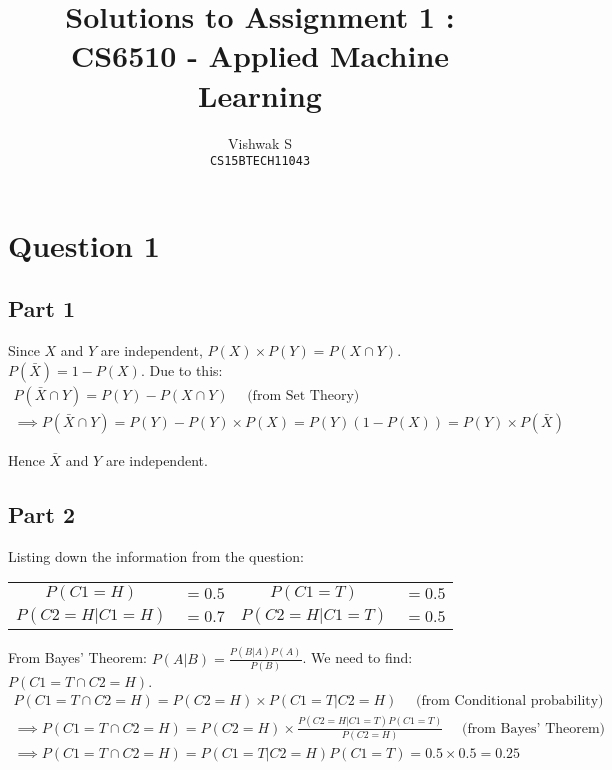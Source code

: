 \documentclass{article}
\title{Solutions to Assignment 1 : CS6510 - Applied Machine Learning}
\author{Vishwak S\\
\texttt{CS15BTECH11043}}
\date{}
\begin{document}
\maketitle

\section*{Question 1}
\subsection*{Part 1}
\begin{flushleft}
Since \(X\) and \(Y\) are independent, \(P(X)\times P(Y) = P(X \cap Y)\). \(P(\bar{X}) = 1 - P(X)\). Due to this:
\begin{gather*}
P(\bar{X} \cap Y) = P(Y) - P(X \cap Y) \quad \text{ (from Set Theory)} \\
\implies P(\bar{X} \cap Y) = P(Y) - P(Y)\times P(X) = P(Y)(1 - P(X)) = P(Y) \times P(\bar{X}) 
\end{gather*}

Hence \(\bar{X}\) and \(Y\) are independent.
\end{flushleft}

\subsection*{Part 2}
\begin{flushleft}
Listing down the information from the question:
\begin{center}
\begin{tabular}{c c c c}
\(P(C1 = H) \) & \(= 0.5\) & \(P(C1 = T) \) & \( = 0.5\) \\
\(P(C2 = H | C1 = H) \) & \(= 0.7\) & \(P(C2 = H | C1 = T) \) & \( = 0.5\) 
\end{tabular}
\end{center}

From Bayes' Theorem: \(P(A | B) = \displaystyle \frac{P(B | A) P(A)}{P(B)}\). We need to find: \(P(C1 = T \cap C2 = H)\).
\begin{gather*}
P(C1 = T \cap C2 = H) = P(C2 = H) \times P(C1 = T | C2 = H) \quad \text{ (from Conditional probability)} \\
\implies P(C1 = T \cap C2 = H) = P(C2 = H) \times \displaystyle \frac{P(C2 = H | C1 = T) P(C1 = T)}{P(C2 = H)} \quad \text{ (from Bayes' Theorem)}\\
\implies P(C1 = T \cap C2 = H) = P(C1 = T | C2 = H) P(C1 = T) = 0.5 \times 0.5 = \boxed{0.25}
\end{gather*}
\end{flushleft}
\end{document}
